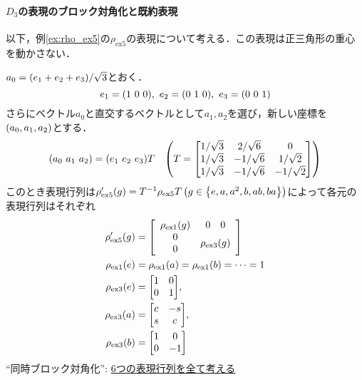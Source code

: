 \documentclass[main]{subfiles}
\begin{document}
	\paragraph{$D_3$の表現のブロック対角化と既約表現}
		以下，例\ref{ex:rho_ex5}の$\rho_\text{ex5}$の表現について考える．この表現は正三角形の重心を動かさない．

		$a_0=\qty(e_1+e_2+e_3)/\sqrt{3}$とおく．
		\[e_1=\qty(1\ 0\ 0),\ e_2=\qty(0\ 1\ 0),\ e_3=\qty(0\ 0\ 1)\]
		さらにベクトル$a_0$と直交するベクトルとして$a_1,a_2$を選び，新しい座標を$\qty(a_0,a_1,a_2)$とする．
		\[\qty(a_0\ a_1\ a_2)=\qty(e_1\ e_2\ e_3)T\quad\qty(T=\mqty[1/\sqrt{3}&2/\sqrt{6}&0\\1/\sqrt{3}&-1/\sqrt{6}&1/\sqrt{2}\\1/\sqrt{3}&-1/\sqrt{6}&-1/\sqrt{2}])\]
		このとき表現行列は$\rho^\prime_\text{ex5}\qty(g)=T^{-1}\rho_\text{ex5}T\,\qty(g\in\qty{e,a,a^2,b,ab,ba})$によって各元の表現行列はそれぞれ
		\begin{align*}
			\rho^\prime_\text{ex5}\qty(g) & =\qty[\begin{array}{cc}
					                                      \rho_\text{ex1}\qty(g)                & {\begin{array}{cc} 0 & 0 \end{array}} \\
					                                      {\begin{array}{c} 0 \\ 0 \end{array}} & \rho_\text{ex3}\qty(g)
				                                      \end{array}]   \\
			\rho_\text{ex1}\qty(e)        & =\rho_\text{ex1}\qty(a)=\rho_\text{ex1}\qty(b)=\cdots=1                      \\
			\rho_\text{ex3}\qty(e)        & =\mqty[1                                                                & 0  \\0&1],\\
			\rho_\text{ex3}\qty(a)        & =\mqty[c                                                                & -s \\s&c],\\
			\rho_\text{ex3}\qty(b)        & =\mqty[1                                                                & 0  \\0&-1]
		\end{align*}
		{\color{red}``同時ブロック対角化'': \underline{6つの表現行列を全て考える}}
\end{document}
